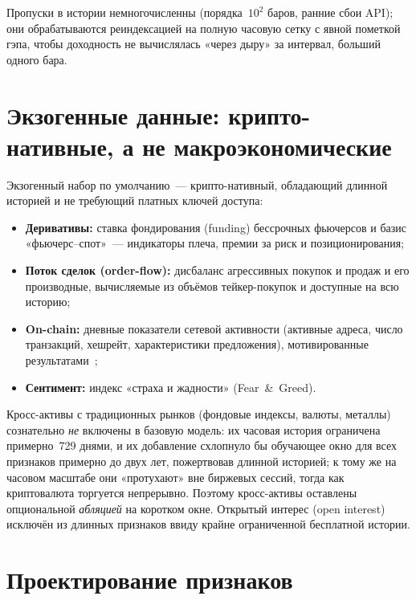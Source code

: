 \documentclass[12pt,a4paper]{report}
\begin{document}
Пропуски в истории немногочисленны (порядка~$10^{2}$ баров, ранние сбои API);
они обрабатываются реиндексацией на полную часовую сетку с явной пометкой гэпа,
чтобы доходность не вычислялась «через дыру» за интервал, больший одного бара.

\section{Экзогенные данные: крипто-нативные, а не макроэкономические}

Экзогенный набор по умолчанию~--- крипто-нативный, обладающий длинной историей и не
требующий платных ключей доступа:
\begin{itemize}[leftmargin=*]
  \item \textbf{Деривативы:} ставка фондирования (funding) бессрочных фьючерсов и
        базис «фьючерс--спот»~--- индикаторы плеча, премии за риск и позиционирования;
  \item \textbf{Поток сделок (order-flow):} дисбаланс агрессивных покупок и продаж
        и его производные, вычисляемые из объёмов тейкер-покупок и доступные на всю
        историю;
  \item \textbf{On-chain:} дневные показатели сетевой активности (активные адреса,
        число транзакций, хешрейт, характеристики предложения), мотивированные
        результатами~\cite{kim2022};
  \item \textbf{Сентимент:} индекс «страха и жадности» (Fear~\&~Greed).
\end{itemize}

Кросс-активы с традиционных рынков (фондовые индексы, валюты, металлы) сознательно
\emph{не} включены в базовую модель: их часовая история ограничена примерно~729
днями, и их добавление схлопнуло бы обучающее окно для всех признаков примерно до двух лет,
пожертвовав длинной историей; к тому же на часовом масштабе они «протухают» вне
биржевых сессий, тогда как криптовалюта торгуется непрерывно. Поэтому кросс-активы
оставлены опциональной \emph{абляцией} на коротком окне. Открытый интерес (open
interest) исключён из длинных признаков ввиду крайне ограниченной бесплатной истории.

\section{Проектирование признаков}
\end{document}
